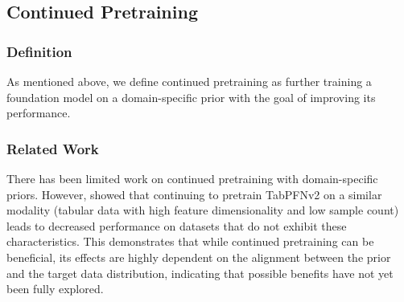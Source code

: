 \subsection{Continued Pretraining}
\subsubsection{Definition}
As mentioned above, we define continued pretraining as further training a foundation model on a domain-specific prior with the goal of improving its performance.
\subsubsection{Related Work}
There has been limited work on continued pretraining with domain-specific priors. However, \citet{kolberg2025tabpfn} showed that continuing to pretrain TabPFNv2 on a similar modality (tabular data with high feature dimensionality and low sample count) leads to decreased performance on datasets that do not exhibit these characteristics.
This demonstrates that while continued pretraining can be beneficial, its effects are highly dependent on the alignment between the prior and the target data distribution, indicating that possible benefits have not yet been fully explored.
\newline

